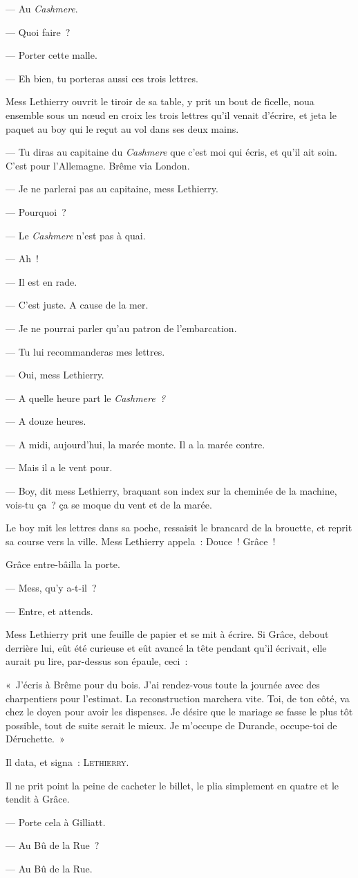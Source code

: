 \documentclass[french,twoside]{book} %
\begin{document}
— Au \emph{Cashmere}.\par
— Quoi faire ?\par
— Porter cette malle.\par
— Eh bien, tu porteras aussi ces trois lettres.\par
Mess Lethierry ouvrit le tiroir de sa table, y prit  un bout de ficelle, noua ensemble sous un nœud en croix les trois lettres qu’il venait d’écrire, et jeta le paquet au boy qui le reçut au vol dans ses deux mains.\par
— Tu diras au capitaine du \emph{Cashmere} que c’est moi qui écris, et qu’il ait soin. C’est pour l’Allemagne. Brême via London.\par
— Je ne parlerai pas au capitaine, mess Lethierry.\par
— Pourquoi ?\par
— Le \emph{Cashmere} n’est pas à quai.\par
— Ah !\par
— Il est en rade.\par
— C’est juste. A cause de la mer.\par
— Je ne pourrai parler qu’au patron de l’embarcation.\par
— Tu lui recommanderas mes lettres.\par
— Oui, mess Lethierry.\par
— A quelle heure part le \emph{Cashmere ?}\par
— A douze heures.\par
— A midi, aujourd’hui, la marée monte. Il a la marée contre.\par
— Mais il a le vent pour.\par
— Boy, dit mess Lethierry, braquant son index sur la cheminée de la machine, vois-tu ça ? ça se moque du vent et de la marée.\par
Le boy mit les lettres dans sa poche, ressaisit le brancard de la brouette, et reprit sa course vers la ville. Mess Lethierry appela : Douce ! Grâce !\par
Grâce entre-bâilla la porte.\par
— Mess, qu’y a-t-il ?\par
 — Entre, et attends.\par
Mess Lethierry prit une feuille de papier et se mit à écrire. Si Grâce, debout derrière lui, eût été curieuse et eût avancé la tête pendant qu’il écrivait, elle aurait pu lire, par-dessus son épaule, ceci :\par
\bigbreak
\noindent « J’écris à Brême pour du bois. J’ai rendez-vous toute la journée avec des charpentiers pour l’estimat. La reconstruction marchera vite. Toi, de ton côté, va chez le doyen pour avoir les dispenses. Je désire que le mariage se fasse le plus tôt possible, tout de suite serait le mieux. Je m’occupe de Durande, occupe-toi de Déruchette. »\par
\bigbreak
\noindent Il data, et signa : L{\scshape ethierry}.\par
Il ne prit point la peine de cacheter le billet, le plia simplement en quatre et le tendit à Grâce.\par
— Porte cela à Gilliatt.\par
— Au Bû de la Rue ?\par
— Au Bû de la Rue.\par
\end{document}
